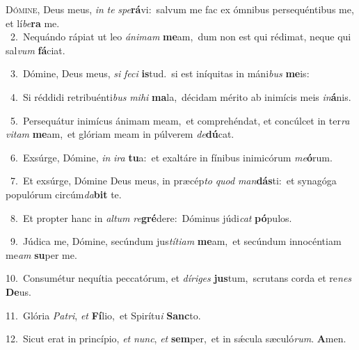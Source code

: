 \lettrine{\initial\textcolor{\initialcolor}{D}}{ómine,} Deus meus, \textit{in} \textit{te} \textit{spe}\-\textbf{rá}vi:~\star salvum me fac ex ómnibus persequéntibus me, et lí\-\textit{be}\-\textbf{ra} me.\\
{\numbfont\textcolor{\numbcolor}{~2.}}~Nequándo rápiat ut leo \textit{á}\-\textit{ni}\textit{mam} \textbf{me}\-am,~\star dum non est qui rédimat, neque qui sal\textit{vum} \textbf{fá}\-ciat.\par
{\numbfont\textcolor{\numbcolor}{~3.}}~Dómine, Deus meus, \textit{si} \textit{fe}\-\textit{ci} \textbf{is}\-tud.~\star si est iníquitas in máni\textit{bus} \textbf{me}\-is:\par
{\numbfont\textcolor{\numbcolor}{~4.}}~Si réddidi retribuénti\textit{bus} \textit{mi}\-\textit{hi} \textbf{ma}\-la,~\star décidam mérito ab inimícis meis \textit{in}\-\textbf{á}nis.\par
{\numbfont\textcolor{\numbcolor}{~5.}}~Persequátur inimícus ánimam meam,~\dagger et comprehéndat, et concúlcet in ter\textit{ra} \textit{vi}\-\textit{tam} \textbf{me}\-am,~\star et glóriam meam in púlverem \textit{de}\-\textbf{dú}cat.\par
{\numbfont\textcolor{\numbcolor}{~6.}}~Exsúrge, Dómine, \textit{in} \textit{i}\-\textit{ra} \textbf{tu}\-a:~\star et exaltáre in fínibus inimicórum \textit{me}\-\textbf{ó}rum.\par
{\numbfont\textcolor{\numbcolor}{~7.}}~Et exsúrge, Dómine Deus meus, in præcép\textit{to} \textit{quod} \textit{man}\-\textbf{dás}ti:~\star et synagóga populórum circúm\-\textit{da}\-\textbf{bit} te.\par
{\numbfont\textcolor{\numbcolor}{~8.}}~Et propter hanc in \textit{al}\-\textit{tum} \textit{re}\-\textbf{gré}dere:~\star Dóminus júdi\textit{cat} \textbf{pó}\-pulos.\par
{\numbfont\textcolor{\numbcolor}{~9.}}~Júdica me, Dómine, secúndum jus\-\textit{tí}\-\textit{ti}\textit{am} \textbf{me}\-am,~\star et secúndum innocéntiam me\textit{am} \textbf{su}\-per me.\par
{\numbfont\textcolor{\numbcolor}{10.}}~Consumétur nequítia peccatórum, et \textit{dí}\-\textit{ri}\textit{ges} \textbf{jus}\-tum,~\star scrutans corda et re\textit{nes} \textbf{De}\-us.\par
{\numbfont\textcolor{\numbcolor}{11.}}~Glória \textit{Pa}\-\textit{tri}, \textit{et} \textbf{Fí}\-lio,~\star et Spirítu\textit{i} \textbf{Sanc}\-to.\par
{\numbfont\textcolor{\numbcolor}{12.}}~Sicut erat in princípio, \textit{et} \textit{nunc}\-, \textit{et} \textbf{sem}\-per,~\star et in sǽcula sæculó\-\textit{rum}\-. \textbf{A}\-men.\par
